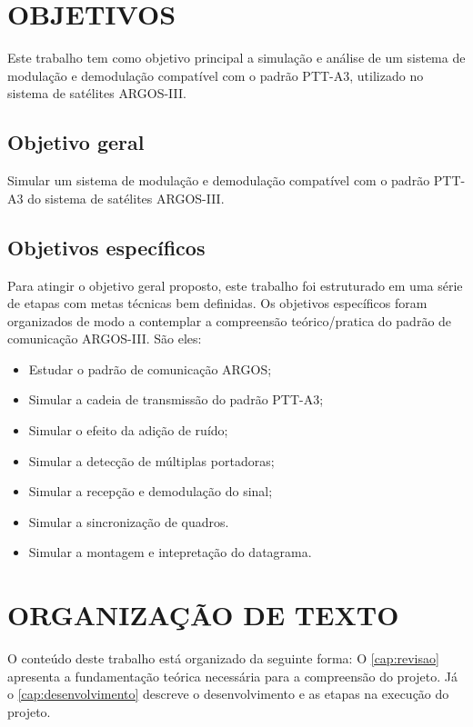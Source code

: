 \section{OBJETIVOS}\label{cap:objetivos}

Este trabalho tem como objetivo principal a simulação e análise de um sistema de modulação e demodulação compatível com o padrão \gls{PTT-A3}, utilizado no sistema de satélites \gls{ARGOS-III}. 

\subsection{Objetivo geral}

Simular um sistema de modulação e demodulação compatível com o padrão \gls{PTT-A3} do sistema de satélites \gls{ARGOS-III}.

\subsection{Objetivos específicos}

Para atingir o objetivo geral proposto, este trabalho foi estruturado em uma série de etapas com metas técnicas bem definidas. Os objetivos específicos foram organizados de modo a contemplar a compreensão teórico/pratica do padrão de comunicação \gls{ARGOS-III}. São eles:

\begin{itemize}
   \item Estudar o padrão de comunicação ARGOS; 
   \item Simular a cadeia de transmissão do padrão \gls{PTT-A3}; 
   \item Simular o efeito da adição de ruído;
   \item Simular a detecção de múltiplas portadoras;
   \item Simular a recepção e demodulação do sinal; 
   \item Simular a sincronização de quadros.
   \item Simular a montagem e intepretação do datagrama.
\end{itemize}


\section{ORGANIZAÇÃO DE TEXTO}

O conteúdo deste trabalho está organizado da seguinte forma: O  \autoref{cap:revisao} apresenta a fundamentação teórica necessária para a compreensão do projeto. Já o \autoref{cap:desenvolvimento} descreve o desenvolvimento e as etapas na execução do projeto.